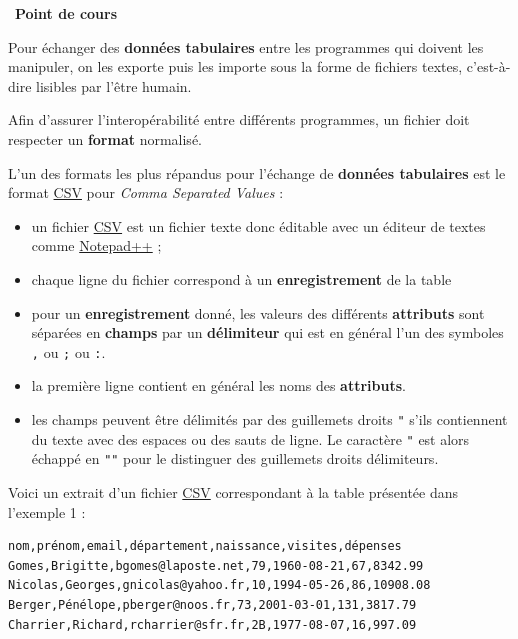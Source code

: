 \documentclass[
  11pt,
]{article}
\newcommand{\passthrough}[1]{#1}
\providecommand{\tightlist}{%
  \setlength{\itemsep}{0pt}\setlength{\parskip}{0pt}}
\newcounter{cours}
\newenvironment{cours}[1]
{\par \medskip   \addtocounter{cours}{1} \noindent  
\begin{bclogo}[arrondi =0.1,  ombre = true, barre=none, logo=\bcbook, marge=4]{~\textbf{Point de cours} \textbf{\thecours} {\itshape #1} }  \par}
{
\end{bclogo}
 \par \bigskip }
\newcounter{prog}
\begin{document}
\begin{cours}{}

Pour échanger des \textbf{données tabulaires} entre les programmes qui
doivent les manipuler, on les exporte puis les importe sous la forme de
fichiers textes, c'est-à-dire lisibles par l'être humain.

Afin d'assurer l'interopérabilité entre différents programmes, un
fichier doit respecter un \textbf{format} normalisé.

L'un des formats les plus répandus pour l'échange de \textbf{données
tabulaires} est le format
\href{https://fr.wikipedia.org/wiki/Comma-separated_values}{CSV} pour
\emph{Comma Separated Values} :

\begin{itemize}
\tightlist
\item
  un fichier
  \href{https://fr.wikipedia.org/wiki/Comma-separated_values}{CSV} est
  un fichier texte donc éditable avec un éditeur de textes comme
  \href{https://notepad-plus-plus.org/downloads/}{Notepad++} ;
\item
  chaque ligne du fichier correspond à un \textbf{enregistrement} de la
  table
\item
  pour un \textbf{enregistrement} donné, les valeurs des différents
  \textbf{attributs} sont séparées en \textbf{champs} par un
  \textbf{délimiteur} qui est en général l'un des symboles
  \passthrough{\lstinline!,!} ou \passthrough{\lstinline!;!} ou
  \passthrough{\lstinline!:!}.
\item
  la première ligne contient en général les noms des \textbf{attributs}.
\item
  les champs peuvent être délimités par des guillemets droits
  \passthrough{\lstinline!"!} s'ils contiennent du texte avec des
  espaces ou des sauts de ligne. Le caractère
  \passthrough{\lstinline!"!} est alors échappé en
  \passthrough{\lstinline!""!} pour le distinguer des guillemets droits
  délimiteurs.
\end{itemize}

Voici un extrait d'un fichier
\href{https://fr.wikipedia.org/wiki/Comma-separated_values}{CSV}
correspondant à la table présentée dans l'exemple 1 :

\begin{lstlisting}
nom,prénom,email,département,naissance,visites,dépenses
Gomes,Brigitte,bgomes@laposte.net,79,1960-08-21,67,8342.99
Nicolas,Georges,gnicolas@yahoo.fr,10,1994-05-26,86,10908.08
Berger,Pénélope,pberger@noos.fr,73,2001-03-01,131,3817.79
Charrier,Richard,rcharrier@sfr.fr,2B,1977-08-07,16,997.09
\end{lstlisting}


\end{cours}
\end{document}

